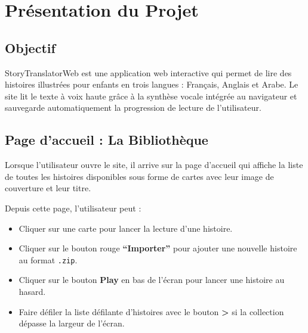 \documentclass[12pt,twoside,letterpaper]{article}
\begin{document}



\tableofcontents
\newpage


\section{Présentation du Projet}

\subsection{Objectif}
StoryTranslatorWeb est une application web interactive qui permet de lire des histoires illustrées pour enfants en trois langues : Français, Anglais et Arabe. Le site lit le texte à voix haute grâce à la synthèse vocale intégrée au navigateur et sauvegarde automatiquement la progression de lecture de l'utilisateur.

\subsection{Page d'accueil : La Bibliothèque}
Lorsque l'utilisateur ouvre le site, il arrive sur la page d'accueil qui affiche la liste de toutes les histoires disponibles sous forme de cartes avec leur image de couverture et leur titre.

Depuis cette page, l'utilisateur peut :
\begin{itemize}
    \item Cliquer sur une carte pour lancer la lecture d'une histoire.
    \item Cliquer sur le bouton rouge \textbf{``Importer''} pour ajouter une nouvelle histoire au format \texttt{.zip}.
    \item Cliquer sur le bouton \textbf{Play} en bas de l'écran pour lancer une histoire au hasard.
    \item Faire défiler la liste défilante d'histoires avec le bouton \textbf{\textgreater} si la collection dépasse la largeur de l'écran.
\end{itemize}
\end{document}
